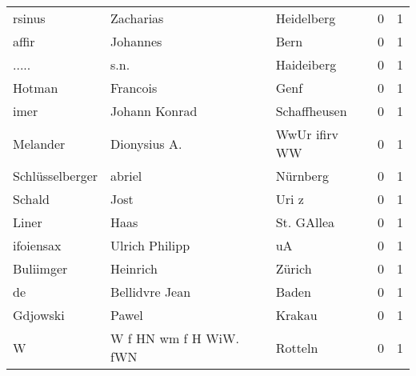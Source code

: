 \documentclass[10pt,a4paper,landscape]{article}
\begin{document}
\begin{longtable}{llllrr}
                   rsinus &                          Zacharias &             &                                  Heidelberg &          0 &         1 \\
                    affir &                           Johannes &             &                                        Bern &          0 &         1 \\
                    ..... &                               s.n. &             &                                  Haideiberg &          0 &         1 \\
                   Hotman &                           Francois &             &                                        Genf &          0 &         1 \\
                     imer &                      Johann Konrad &             &                                Schaffheusen &          0 &         1 \\
                 Melander &                       Dionysius A. &             &                               WwUr ifirv WW &          0 &         1 \\
          Schlüsselberger &                             abriel &             &                                    Nürnberg &          0 &         1 \\
                   Schald &                               Jost &             &                                       Uri z &          0 &         1 \\
                    Liner &                               Haas &             &                                  St. GAllea &          0 &         1 \\
                ifoiensax &                     Ulrich Philipp &             &                                          uA &          0 &         1 \\
                Buliimger &                           Heinrich &             &                                      Zürich &          0 &         1 \\
                       de &                     Bellidvre Jean &             &                                       Baden &          0 &         1 \\
                 Gdjowski &                              Pawel &             &                                      Krakau &          0 &         1 \\
                        W &             W f HN wm f H WiW. fWN &             &                                     Rotteln &          0 &         1 \\

\end{longtable}
\end{document}
